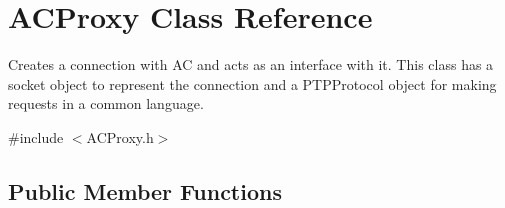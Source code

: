 \hypertarget{class_a_c_proxy}{\section{A\-C\-Proxy Class Reference}
\label{class_a_c_proxy}
}


Creates a connection with A\-C and acts as an interface with it. This class has a socket object to represent the connection and a P\-T\-P\-Protocol object for making requests in a common language.  




{\ttfamily \#include $<$A\-C\-Proxy.\-h$>$}

\subsection*{Public Member Functions}
